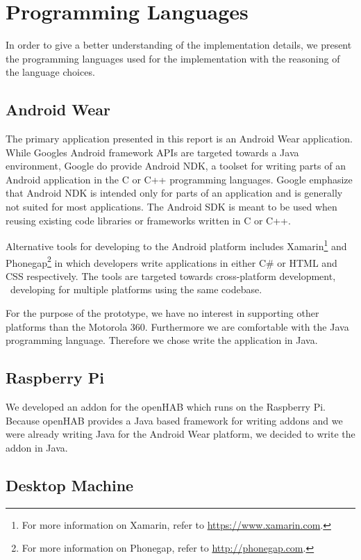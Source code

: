 \section{Programming Languages}
\label{sec:implementation:programming-language}

In order to give a better understanding of the implementation details, we present the programming languages used for the implementation with the reasoning of the language choices.

\subsection{Android Wear}

The primary application presented in this report is an Android Wear application. While Googles Android framework APIs are targeted towards a Java environment, Google do provide Android NDK, a toolset for writing parts of an Android application in the C or C++ programming languages. Google emphasize that Android NDK is intended only for parts of an application and is generally not suited for most applications. The Android SDK is meant to be used when reusing existing code libraries or frameworks written in C or C++.

Alternative tools for developing to the Android platform includes Xamarin\footnote{For more information on Xamarin, refer to \url{https://www.xamarin.com}.} and Phonegap\footnote{For more information on Phonegap, refer to \url{http://phonegap.com}.} in which developers write applications in either C\# or HTML and CSS respectively. The tools are targeted towards cross-platform development, \ie~developing for multiple platforms using the same codebase.

For the purpose of the prototype, we have no interest in supporting other platforms than the Motorola 360. Furthermore we are comfortable with the Java programming language. Therefore we chose write the application in Java.

\subsection{Raspberry Pi}

We developed an addon for the openHAB which runs on the Raspberry Pi. Because openHAB provides a Java based framework for writing addons and we were already writing Java for the Android Wear platform, we decided to write the addon in Java.

\subsection{Desktop Machine}

